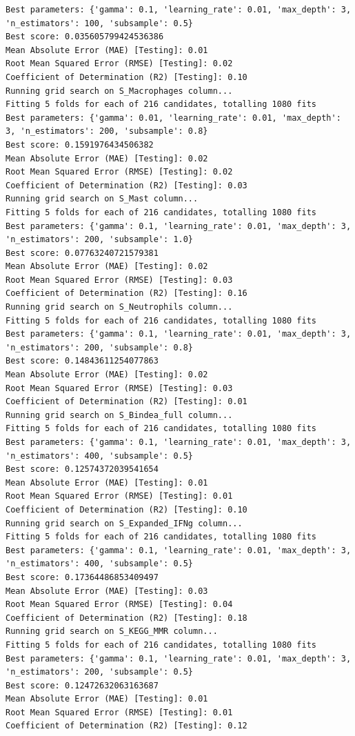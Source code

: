 \documentclass[
  letterpaper,
  DIV=11,
  numbers=noendperiod]{scrartcl}
\begin{document}
\begin{verbatim}
Best parameters: {'gamma': 0.1, 'learning_rate': 0.01, 'max_depth': 3, 'n_estimators': 100, 'subsample': 0.5}
Best score: 0.035605799424536386
Mean Absolute Error (MAE) [Testing]: 0.01
Root Mean Squared Error (RMSE) [Testing]: 0.02
Coefficient of Determination (R2) [Testing]: 0.10
Running grid search on S_Macrophages column...
Fitting 5 folds for each of 216 candidates, totalling 1080 fits
Best parameters: {'gamma': 0.01, 'learning_rate': 0.01, 'max_depth': 3, 'n_estimators': 200, 'subsample': 0.8}
Best score: 0.1591976434506382
Mean Absolute Error (MAE) [Testing]: 0.02
Root Mean Squared Error (RMSE) [Testing]: 0.02
Coefficient of Determination (R2) [Testing]: 0.03
Running grid search on S_Mast column...
Fitting 5 folds for each of 216 candidates, totalling 1080 fits
Best parameters: {'gamma': 0.1, 'learning_rate': 0.01, 'max_depth': 3, 'n_estimators': 200, 'subsample': 1.0}
Best score: 0.07763240721579381
Mean Absolute Error (MAE) [Testing]: 0.02
Root Mean Squared Error (RMSE) [Testing]: 0.03
Coefficient of Determination (R2) [Testing]: 0.16
Running grid search on S_Neutrophils column...
Fitting 5 folds for each of 216 candidates, totalling 1080 fits
Best parameters: {'gamma': 0.1, 'learning_rate': 0.01, 'max_depth': 3, 'n_estimators': 200, 'subsample': 0.8}
Best score: 0.14843611254077863
Mean Absolute Error (MAE) [Testing]: 0.02
Root Mean Squared Error (RMSE) [Testing]: 0.03
Coefficient of Determination (R2) [Testing]: 0.01
Running grid search on S_Bindea_full column...
Fitting 5 folds for each of 216 candidates, totalling 1080 fits
Best parameters: {'gamma': 0.1, 'learning_rate': 0.01, 'max_depth': 3, 'n_estimators': 400, 'subsample': 0.5}
Best score: 0.12574372039541654
Mean Absolute Error (MAE) [Testing]: 0.01
Root Mean Squared Error (RMSE) [Testing]: 0.01
Coefficient of Determination (R2) [Testing]: 0.10
Running grid search on S_Expanded_IFNg column...
Fitting 5 folds for each of 216 candidates, totalling 1080 fits
Best parameters: {'gamma': 0.1, 'learning_rate': 0.01, 'max_depth': 3, 'n_estimators': 400, 'subsample': 0.5}
Best score: 0.17364486853409497
Mean Absolute Error (MAE) [Testing]: 0.03
Root Mean Squared Error (RMSE) [Testing]: 0.04
Coefficient of Determination (R2) [Testing]: 0.18
Running grid search on S_KEGG_MMR column...
Fitting 5 folds for each of 216 candidates, totalling 1080 fits
Best parameters: {'gamma': 0.1, 'learning_rate': 0.01, 'max_depth': 3, 'n_estimators': 200, 'subsample': 0.5}
Best score: 0.12472632063163687
Mean Absolute Error (MAE) [Testing]: 0.01
Root Mean Squared Error (RMSE) [Testing]: 0.01
Coefficient of Determination (R2) [Testing]: 0.12

\end{verbatim}
\end{document}
